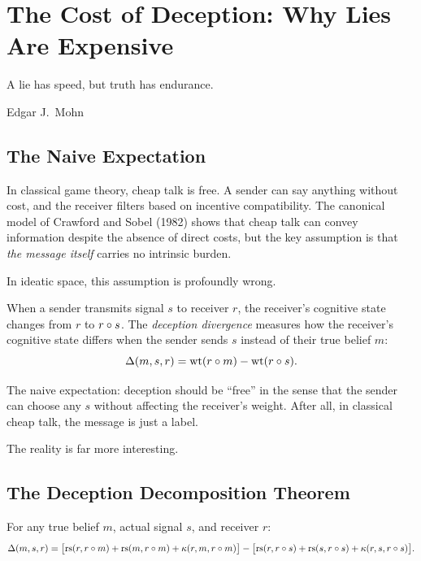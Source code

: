 
\chapter{The Cost of Deception: Why Lies Are Expensive}

\epigraph{A lie has speed, but truth has endurance.}{Edgar J.\ Mohn}

\section{The Naive Expectation}

In classical game theory, cheap talk is free. A sender can say anything without cost, and the receiver filters based on incentive compatibility. The canonical model of Crawford and Sobel (1982) shows that cheap talk can convey information despite the absence of direct costs, but the key assumption is that \emph{the message itself} carries no intrinsic burden.

In ideatic space, this assumption is profoundly wrong.

When a sender transmits signal $s$ to receiver $r$, the receiver's cognitive state changes from $r$ to $r \circ s$. The \emph{deception divergence} measures how the receiver's cognitive state differs when the sender sends $s$ instead of their true belief $m$:
\[
\Delta(m, s, r) = \operatorname{wt}(r \circ m) - \operatorname{wt}(r \circ s).
\]

The naive expectation: deception should be ``free'' in the sense that the sender can choose any $s$ without affecting the receiver's weight. After all, in classical cheap talk, the message is just a label.

The reality is far more interesting.

\section{The Deception Decomposition Theorem}

\begin{theorem}
\label{thm:deception-decomposition}
For any true belief $m$, actual signal $s$, and receiver $r$:
\[
\Delta(m,s,r) = \bigl[\operatorname{rs}(r, r \circ m) + \operatorname{rs}(m, r \circ m) + \kappa(r,m,r \circ m)\bigr] - \bigl[\operatorname{rs}(r, r \circ s) + \operatorname{rs}(s, r \circ s) + \kappa(r,s,r \circ s)\bigr].
\]
\end{theorem}

